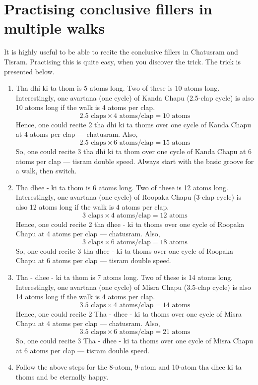 \section*{Practising conclusive fillers in multiple walks}

It is highly useful to be able to recite the conclusive fillers in Chatusram and
Tisram. Practising this is quite easy, when you discover the trick. The trick is
presented below.

\begin{enumerate}
  \item Tha dhi ki ta thom is 5 atoms long. Two of these is 10 atoms long.
    Interestingly, one avartana (one cycle) of Kanda Chapu (2.5-clap cycle) is also 10
    atoms long if the walk is 4 atoms per clap.
    \[ 2.5 \text{ claps} \times 4 \text{ atoms/clap} = 10 \text{ atoms} \]
    Hence, one could recite 2 tha dhi ki ta thoms over one cycle of Kanda Chapu at 4
    atoms per clap --- chatusram. Also,
    \[ 2.5 \text{ claps} \times 6 \text{ atoms/clap} = 15 \text{ atoms} \]
    So, one could recite 3 tha dhi ki ta thom over one cycle of Kanda Chapu at 6 atoms
    per clap --- tisram double speed. Always start with the basic groove for a walk,
    then switch.

  \item Tha dhee - ki ta thom is 6 atoms long. Two of these is 12 atoms long.
    Interestingly, one avartana (one cycle) of Roopaka Chapu (3-clap cycle) is also 12
    atoms long if the walk is 4 atoms per clap.
    \[ 3 \text{ claps} \times 4 \text{ atoms/clap} = 12 \text{ atoms} \]
    Hence, one could recite 2 tha dhee - ki ta thoms over one cycle of Roopaka Chapu at
    4 atoms per clap --- chatusram. Also,
    \[ 3 \text{ claps} \times 6 \text{ atoms/clap} = 18 \text{ atoms} \]
    So, one could recite 3 tha dhee - ki ta thoms over one cycle of Roopaka Chapu at 6
    atoms per clap --- tisram double speed.

  \item Tha - dhee - ki ta thom is 7 atoms long. Two of these is 14 atoms long.
    Interestingly, one avartana (one cycle) of Misra Chapu (3.5-clap cycle) is also 14
    atoms long if the walk is 4 atoms per clap.
    \[ 3.5 \text{ claps} \times 4 \text{ atoms/clap} = 14 \text{ atoms} \]
    Hence, one could recite 2 Tha - dhee - ki ta thoms over one cycle of Misra Chapu at
    4 atoms per clap --- chatusram. Also,
    \[ 3.5 \text{ claps} \times 6 \text{ atoms/clap} = 21 \text{ atoms} \]
    So, one could recite 3 Tha - dhee - ki ta thoms over one cycle of Misra Chapu at 6
    atoms per clap --- tisram double speed.

  \item Follow the above steps for the 8-atom, 9-atom and 10-atom tha dhee ki ta thoms
    and be eternally happy.
\end{enumerate}
